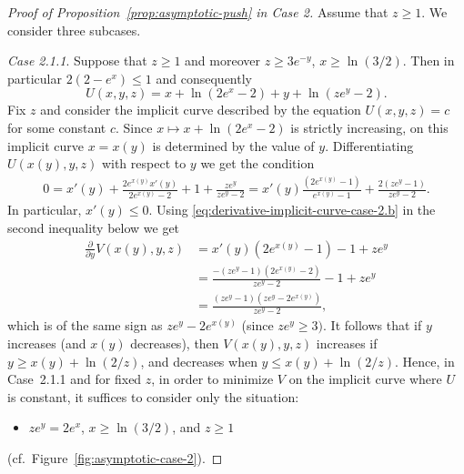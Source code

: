 \documentclass[a4paper]{amsart} %
\newtheorem{lemma}[theorem]{Lemma}
\theoremstyle{definition}
\theoremstyle{remark}
\numberwithin{equation}{section}
\newcommand*{\XXXasymptoticDenominator}{V}
\newcommand*{\XXXasymptoticNominator}{U}
\begin{document}
\begin{proof}[Proof of Proposition~\ref{prop:asymptotic-push} in Case 2]
Assume that $z\geq 1$.	
We consider three subcases.

\emph{Case 2.1.1}.
	Suppose that $z \geq 1$ and moreover $z \geq 3e^{-y}$, $x\geq \ln(3/2)$.
	Then in particular $2(2-e^x)\leq 1$
	and consequently
	\begin{equation*}
	\XXXasymptoticNominator(x,y,z) = x + \ln(2e^x-2) + y + \ln(ze^y - 2).
	\end{equation*}
	Fix $z$ and consider the implicit curve described by the equation $\XXXasymptoticNominator(x,y,z) = c$ for some constant $c$. Since $x\mapsto x + \ln(2e^x - 2)$ is strictly increasing, on this implicit curve
	$x=x(y)$ is determined by the value of $y$.
	Differentiating $\XXXasymptoticNominator(x(y), y,z)$ with respect to $y$ we
	get the condition
	\begin{align}
	\label{eq:derivative-implicit-curve-case-2.b}
	0 = x'(y) + \frac{2e^{x(y)} x'(y)}{2e^{x(y)} - 2} + 1 + \frac{ze^y}{ze^y-2}
	= x'(y) \frac{(2 e^{x(y)}-1)}{e^{x(y)} - 1} + \frac{2(ze^y - 1
		)}{ze^y-2}.
	\end{align}
	In particular, $x'(y)\leq 0$.
	Using \eqref{eq:derivative-implicit-curve-case-2.b} in the second inequality below we get
	\begin{align*}
	\frac{\partial}{\partial y} \XXXasymptoticDenominator(x(y), y, z) 
	&= x'(y)(2e^{x(y)} - 1) - 1 + z e^y \\
	&= \frac{-(ze^y-1)(2e^{x(y)} - 2)}{ze^y-2} - 1 + ze^{y}\\
	&= \frac{(ze^y -1)(ze^y - 2e^{x(y)})}{ze^y-2},
	\end{align*}
	which is of the same sign as $ze^y - 2e^{x(y)}$ (since $ze^{y} \geq 3)$.
	It follows that if $y$ increases (and  $x(y)$ decreases),
	then $\XXXasymptoticDenominator(x(y),y,z)$ increases if $y \geq x(y) + \ln(2/z)$, 
	and decreases when $y\leq x(y) + \ln(2/z)$. 
	Hence, in Case~2.1.1 and for fixed $z$, 
	in order to minimize $\XXXasymptoticDenominator$ on the implicit curve where $\XXXasymptoticNominator$ is constant,
	it suffices to consider only the situation:
	\begin{itemize}
		\item $ze^y = 2e^x$, $x\geq \ln(3/2)$, and $z\geq 1$
	\end{itemize}
	(cf.~Figure~\ref{fig:asymptotic-case-2}).

\end{proof}
\end{document}

